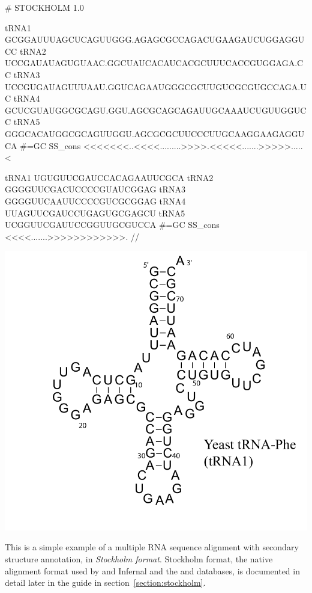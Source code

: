 \vspace{1em}
\begin{minipage}{4.7in}
\begin{sreoutput}[xleftmargin=0em]
# STOCKHOLM 1.0

tRNA1             GCGGAUUUAGCUCAGUUGGG.AGAGCGCCAGACUGAAGAUCUGGAGGUCC
tRNA2             UCCGAUAUAGUGUAAC.GGCUAUCACAUCACGCUUUCACCGUGGAGA.CC
tRNA3             UCCGUGAUAGUUUAAU.GGUCAGAAUGGGCGCUUGUCGCGUGCCAGA.UC
tRNA4             GCUCGUAUGGCGCAGU.GGU.AGCGCAGCAGAUUGCAAAUCUGUUGGUCC
tRNA5             GGGCACAUGGCGCAGUUGGU.AGCGCGCUUCCCUUGCAAGGAAGAGGUCA
#=GC SS_cons      <<<<<<<..<<<<.........>>>>.<<<<<.......>>>>>.....<

tRNA1             UGUGUUCGAUCCACAGAAUUCGCA
tRNA2             GGGGUUCGACUCCCCGUAUCGGAG
tRNA3             GGGGUUCAAUUCCCCGUCGCGGAG
tRNA4             UUAGUUCGAUCCUGAGUGCGAGCU
tRNA5             UCGGUUCGAUUCCGGUUGCGUCCA
#=GC SS_cons      <<<<.......>>>>>>>>>>>>.
//
\end{sreoutput}
\end{minipage}
\begin{minipage}{1.5in}
\includegraphics[scale=0.4]{Figures/trna1-DF6280}
\end{minipage}
\vspace{1em}

This is a simple example of a multiple RNA sequence alignment with
secondary structure annotation, in \emph{Stockholm format}. Stockholm
format, the native alignment format used by  and
Infernal and the  and  databases, is
documented in detail later in the guide in
section~\ref{section:stockholm}.

